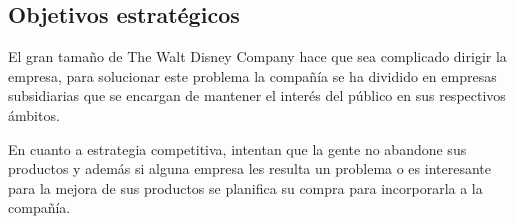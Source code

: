 \subsection{Objetivos estratégicos}
El gran tamaño de The Walt Disney Company hace que sea complicado dirigir la empresa, para solucionar este problema la compañía se ha dividido en empresas subsidiarias que se encargan de mantener el interés del público en sus respectivos ámbitos.

En cuanto a estrategia competitiva, intentan que la gente no abandone sus productos y además si alguna empresa les resulta un problema o es interesante para la mejora de sus productos se planifica su compra para incorporarla a la compañía.